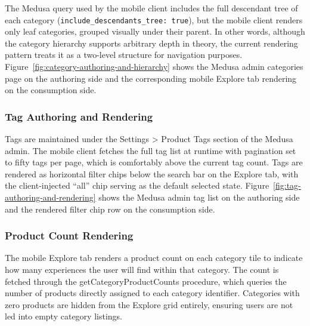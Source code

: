 The Medusa query used by the mobile client includes the full descendant tree of each category (\texttt{include\_\allowbreak descendants\_\allowbreak tree:~true}), but the mobile client renders only leaf categories, grouped visually under their parent. In other words, although the category hierarchy supports arbitrary depth in theory, the current rendering pattern treats it as a two-level structure for navigation purposes. Figure~\ref{fig:category-authoring-and-hierarchy} shows the Medusa admin categories page on the authoring side and the corresponding mobile Explore tab rendering on the consumption side.


\subsubsection{Tag Authoring and Rendering}
Tags are maintained under the Settings > Product Tags section of the Medusa admin. The mobile client fetches the full tag list at runtime with pagination set to fifty tags per page, which is comfortably above the current tag count. Tags are rendered as horizontal filter chips below the search bar on the Explore tab, with the client-injected ``all'' chip serving as the default selected state. Figure~\ref{fig:tag-authoring-and-rendering} shows the Medusa admin tag list on the authoring side and the rendered filter chip row on the consumption side.

\subsubsection{Product Count Rendering}
The mobile Explore tab renders a product count on each category tile to indicate how many experiences the user will find within that category. The count is fetched through the getCategoryProductCounts procedure, which queries the number of products directly assigned to each category identifier. Categories with zero products are hidden from the Explore grid entirely, ensuring users are not led into empty category listings.

